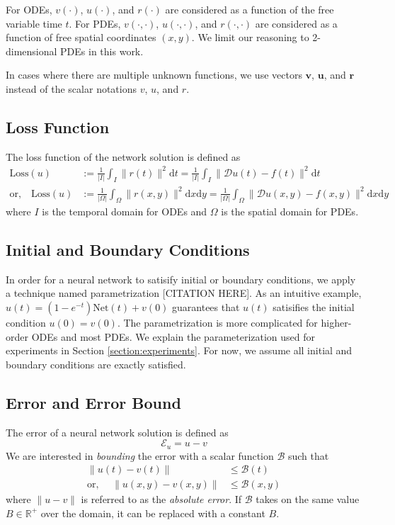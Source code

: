 \documentclass{article}
\newcommand{\vect}[1]{\boldsymbol{\mathbf{#1}}}
\newcommand{\Err}{\mathcal{E}}
\newcommand{\Bound}{\mathcal{B}}
\newcommand{\Loss}{\mathrm{Loss}}
\newcommand{\Net}{\mathrm{Net}}
\begin{document}
    For ODEs, $v(\cdot)$, $u(\cdot)$, and $r(\cdot)$ are considered as a function of the free variable time $t$.
    For PDEs, $v(\cdot, \cdot)$, $u(\cdot, \cdot)$, and $r(\cdot, \cdot)$ are considered as a function of free spatial coordinates $(x, y)$.
    We limit our reasoning to 2-dimensional PDEs in this work.

    In cases where there are multiple unknown functions, we use vectors $\vect{v}$, $\vect{u}$, and $\vect{r}$ instead of the scalar notations $v$, $u$, and $r$.

\subsection{Loss Function}
    The loss function of the network solution is defined as 
    \begin{align}
        \Loss{}(u) &:= \frac{1}{|I|} \int_{I} \|r(t)\|^2 \mathrm{d}t 
            = \frac{1}{|I|} \int_{I} \|\mathcal{D}u(t) - f(t)\|^2 \mathrm{d}t \\
        \text{or,} \quad 
        \Loss{}(u) &:= \frac{1}{|\Omega|} \int_{\Omega} \|r(x, y)\|^2 \mathrm{d}x\mathrm{d}y
            = \frac{1}{|\Omega|} \int_{\Omega} \|\mathcal{D}u(x, y) - f(x, y)\|^2 \mathrm{d}x\mathrm{d}y
    \end{align}
    where $I$ is the temporal domain for ODEs and $\Omega$ is the spatial domain for PDEs.

\subsection{Initial and Boundary Conditions}
    In order for a neural network to satisify initial or boundary conditions, we apply a technique named parametrization [CITATION HERE]. 
    As an intuitive example, $u(t) = (1 - e^{-t}) \Net(t) + v(0)$ guarantees that $u(t)$ satisifies the initial condition $u(0)=v(0)$. 
    The parametrization is more complicated for higher-order ODEs and most PDEs. We explain the parameterization used for experiments in Section \ref{section:experiments}. 
    For now, we assume all initial and boundary conditions are exactly satisfied.

\subsection{Error and Error Bound}
    The error of a neural network solution is defined as 
    \begin{equation}
        \Err_u= u - v
    \end{equation}
    We are interested in \textit{bounding} the error with a scalar function $\Bound$ such that
    \begin{align}
        \|u(t) - v(t)\| &\leq \Bound(t) \\
        \text{or, } \quad \|u(x, y) - v(x, y)\| &\leq \Bound(x, y)
    \end{align}
    where $\|u - v\|$ is referred to as the \textit{absolute error}.
    If $\Bound$ takes on the same value $B \in \mathbb{R}^{+}$ over the domain, it can be replaced with a constant $B$.
\end{document}
